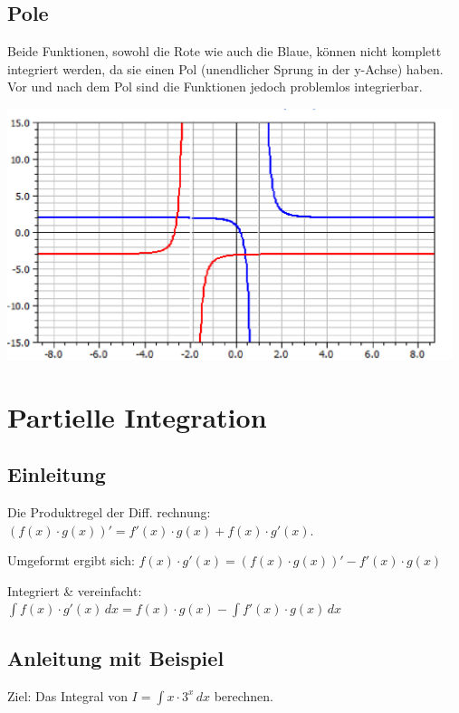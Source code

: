 \documentclass[12pt]{scrartcl}
\begin{document}
\newpage
\subsection{Pole}
Beide Funktionen, sowohl die Rote wie auch die Blaue, können nicht komplett integriert werden, 
da sie einen Pol (unendlicher Sprung in der y-Achse) haben. Vor und nach dem Pol sind die Funktionen
jedoch problemlos integrierbar.

\begin{center}
    \includegraphics[width=13cm]{img/two-poles.png}
\end{center}

\newpage
\section{Partielle Integration} \label{sec:Partielle-Integration}
\subsection{Einleitung}
Die Produktregel der Diff. rechnung: \tab $(f(x) \cdot g(x))' = f'(x) \cdot g(x) + f(x) \cdot g'(x)$.
\vspace*{10px}

Umgeformt ergibt sich: \tab $f(x) \cdot g'(x) = (f(x) \cdot g(x))' - f'(x) \cdot g(x)$
\vspace*{10px}

Integriert \& vereinfacht: \tab $ \int f(x) \cdot g'(x) \, dx = f(x) \cdot g(x) - \int f'(x) \cdot g(x) \, dx $
\vspace*{25px}

\subsection{Anleitung mit Beispiel}
Ziel: Das Integral von $I = \int x \cdot 3^x \, dx$ berechnen.
\end{document}
